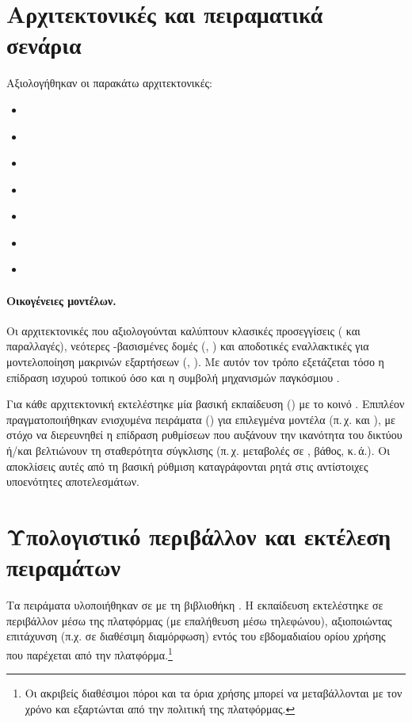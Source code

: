 \section{Αρχιτεκτονικές και πειραματικά σενάρια}
\label{sec:exp_models}

Αξιολογήθηκαν οι παρακάτω αρχιτεκτονικές:
\begin{itemize}
  \item {} \cite{ronneberger2015unet}
  \item {} \cite{oktay2018attentionunet}
  \item {} \cite{isensee2021nnunet}
  \item {} \cite{hatamizadeh2022unetr}
  \item {} \cite{hatamizadeh2022swinunetr}
  \item {} \cite{myronenko2018segresnet}
  \item {} \cite{xing2024segmamba}
\end{itemize}

\paragraph{Οικογένειες μοντέλων.}
Οι αρχιτεκτονικές που αξιολογούνται καλύπτουν κλασικές  προσεγγίσεις
( και παραλλαγές), νεότερες -βασισμένες δομές
(, ) και αποδοτικές εναλλακτικές για μοντελοποίηση
μακρινών εξαρτήσεων (, ). Με αυτόν τον τρόπο
εξετάζεται τόσο η επίδραση ισχυρού τοπικού  όσο και η
συμβολή μηχανισμών παγκόσμιου .

Για κάθε αρχιτεκτονική εκτελέστηκε μία βασική εκπαίδευση
() με το κοινό .
Επιπλέον πραγματοποιήθηκαν ενισχυμένα πειράματα () για
επιλεγμένα μοντέλα (π.\,χ.  και ), με στόχο να
διερευνηθεί η επίδραση ρυθμίσεων που αυξάνουν την ικανότητα του δικτύου ή/και
βελτιώνουν τη σταθερότητα σύγκλισης (π.\,χ. μεταβολές σε
, βάθος, κ.\,ά.).
Οι αποκλίσεις αυτές από τη βασική ρύθμιση καταγράφονται ρητά στις αντίστοιχες
υποενότητες αποτελεσμάτων.

\section{Υπολογιστικό περιβάλλον και εκτέλεση πειραμάτων}
\label{sec:proto_env}
Τα πειράματα υλοποιήθηκαν σε  με τη βιβλιοθήκη
 \cite{cardoso2022monai}. Η εκπαίδευση εκτελέστηκε σε περιβάλλον
 μέσω της πλατφόρμας  (με επαλήθευση μέσω
τηλεφώνου), αξιοποιώντας  επιτάχυνση (π.χ.  σε διαθέσιμη
διαμόρφωση) εντός του εβδομαδιαίου ορίου χρήσης που παρέχεται από την
πλατφόρμα.\footnote{Οι ακριβείς διαθέσιμοι πόροι και τα όρια χρήσης μπορεί να
μεταβάλλονται με τον χρόνο και εξαρτώνται από την πολιτική της πλατφόρμας.}

